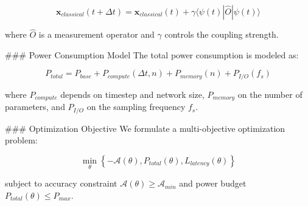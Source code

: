 $$\mathbf{x}_{classical}(t+\Delta t) = \mathbf{x}_{classical}(t) + \gamma \langle \psi(t) | \hat{O} | \psi(t) \rangle$$

where $\hat{O}$ is a measurement operator and $\gamma$ controls the coupling strength.

### Power Consumption Model
The total power consumption is modeled as:

$$P_{total} = P_{base} + P_{compute}(\Delta t, n) + P_{memory}(n) + P_{I/O}(f_s)$$

where $P_{compute}$ depends on timestep and network size, $P_{memory}$ on the number of parameters, 
and $P_{I/O}$ on the sampling frequency $f_s$.

### Optimization Objective
We formulate a multi-objective optimization problem:

$$\min_{\theta} \left\{ -\mathcal{A}(\theta), P_{total}(\theta), L_{latency}(\theta) \right\}$$

subject to accuracy constraint $\mathcal{A}(\theta) \geq \mathcal{A}_{min}$ and power budget $P_{total}(\theta) \leq P_{max}$.